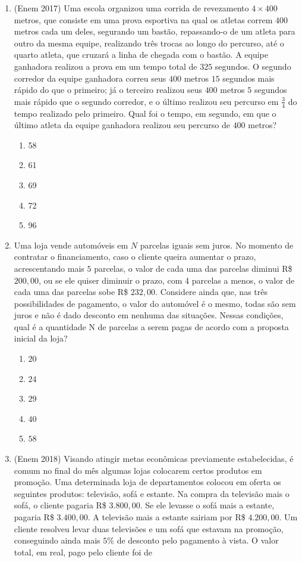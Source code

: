 \begin{enumerate}
\clearpage
\item (Enem 2017) Uma escola organizou uma corrida de revezamento $4\times400$ metros, que consiste em uma prova esportiva na qual os atletas correm $400$ metros cada um deles, segurando um bastão, repassando-o de um atleta para outro da mesma equipe, realizando três trocas ao longo do percurso, até o quarto atleta, que cruzará a linha de chegada com o bastão. A equipe ganhadora realizou a prova em um tempo total de $325$ segundos.
O segundo corredor da equipe ganhadora correu seus $400$ metros $15$ segundos mais rápido do que o primeiro; já o terceiro realizou seus $400$ metros $5$ segundos mais rápido que o segundo corredor, e o último realizou seu percurso em $\frac{3}{4}$ do tempo realizado pelo primeiro.
Qual foi o tempo, em segundo, em que o último atleta da equipe ganhadora realizou seu percurso de $400$ metros?
\begin{enumerate}
\item 58
\item 61
\item 69
\item 72
\item 96
\end{enumerate}


\item Uma loja vende automóveis em $N$ parcelas iguais sem juros. No momento de contratar o financiamento, caso o cliente queira aumentar o prazo, acrescentando mais $5$ parcelas, o valor de cada uma das parcelas diminui R\$ $200{,}00$, ou se ele quiser diminuir o prazo, com 4 parcelas a menos, o valor de cada uma das parcelas sobe R\$ $232{,}00$. Considere ainda que, nas três possibilidades de pagamento, o valor do automóvel é o mesmo, todas são sem juros e não é dado desconto em nenhuma das situações.
Nessas condições, qual é a quantidade N de parcelas a serem pagas de acordo com a proposta inicial da loja?
\begin{enumerate}
\item $20$
\item $24$
\item $29$
\item $40$
\item $58$
\end{enumerate}

\item (Enem 2018) Visando atingir metas econômicas previamente estabelecidas, é comum no final do mês algumas lojas colocarem certos produtos em promoção. Uma determinada loja de departamentos colocou em oferta os seguintes produtos: televisão, sofá e estante. Na compra da televisão mais o sofá, o cliente pagaria R\$ $3.800{,}00$. Se ele levasse o sofá mais a estante, pagaria R\$ $3.400{,}00$. A televisão mais a estante sairiam por R\$ $4.200{,}00$. Um cliente resolveu levar duas televisões e um sofá que estavam na promoção, conseguindo ainda mais $5\%$ de desconto pelo pagamento à vista. O valor total, em real, pago pelo cliente foi de


\end{enumerate}
